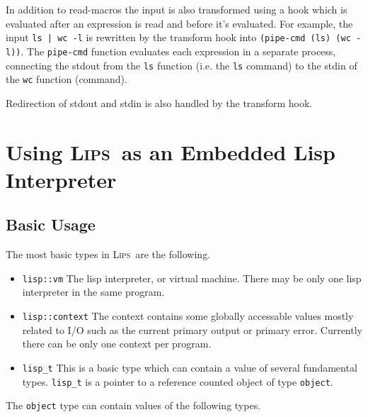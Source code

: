 \documentclass[a4paper]{article}
\newcommand{\lips}{\textsc{Lips}}
\newcommand{\lisp}[1]{\texttt{#1}}
\newcommand{\cpp}[1]{\texttt{#1}}
\begin{document}
In addition to read-macros the input is also transformed using a hook
which is evaluated after an expression is read and before it's
evaluated.  For example, the input \lisp{ls | wc -l} is rewritten by
the transform hook into \lisp{(pipe-cmd (ls) (wc -l))}.  The
\lisp{pipe-cmd} function evaluates each expression in a separate
process, connecting the stdout from the \lisp{ls} function (i.e. the
\lisp{ls} command) to the stdin of the \lisp{wc} function (command).

Redirection of stdout and stdin is also handled by the transform hook.

\section{Using \lips\ as an Embedded Lisp Interpreter}
\subsection{Basic Usage}
The most basic types in \lips\ are the following.
\begin{itemize}
  \item \cpp{lisp::vm} The lisp interpreter, or virtual machine. There
    may be only one lisp interpreter in the same program.
  \item \cpp{lisp::context} The context contains some globally
    accessable values mostly related to I/O such as the current
    primary output or primary error. Currently there can be only one
    context per program.
  \item \cpp{lisp\_t} This is a basic type which can contain a value
    of several fundamental types. \cpp{lisp\_t} is a pointer to a
    reference counted object of type \cpp{object}.
\end{itemize}

The \cpp{object} type can contain values of the following types.
\end{document}
